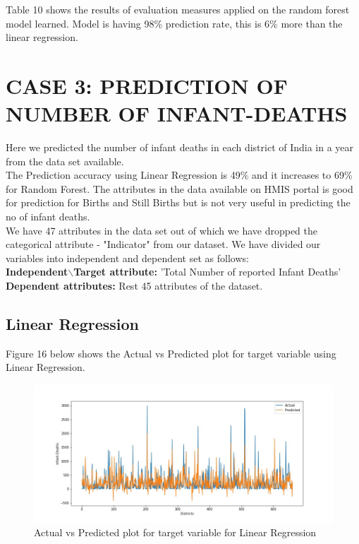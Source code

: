 \documentclass[12pt]{article}
\begin{document}
Table 10 shows the results of evaluation measures applied on the random forest model learned. Model is having 98\% prediction rate, this is 6\% more than the linear regression.\\




\newpage
\section{CASE 3: PREDICTION OF NUMBER OF INFANT-DEATHS}
Here we predicted the number of infant deaths in each district of India in a year from the data set available.\\
The Prediction accuracy using Linear Regression is 49\% and it increases to 69\% for Random Forest. The attributes in the data available on HMIS portal is good for prediction for Births and Still Births but is not very useful in predicting the no of infant deaths.\\


We have 47 attributes in the data set out of which we have dropped the categorical attribute - "Indicator" from our dataset. We have divided our variables into independent and dependent set as follows:\\

\textbf{Independent$\backslash$Target attribute:} 'Total Number of reported Infant Deaths'\\
\textbf{Dependent attributes:} Rest 45 attributes of the dataset.\\



\subsection{Linear Regression}
Figure 16 below shows the Actual vs Predicted plot for target variable using Linear Regression.
\begin{figure}[h]
\hspace{-3.2cm}
\includegraphics[scale=.7]{images/RandomForestInfantDeaths.jpg}
\caption{Actual vs Predicted plot for target variable for Linear Regression}
\end{figure}
\end{document}
